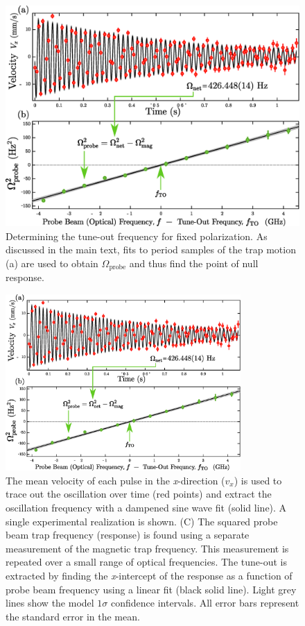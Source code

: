 	\begin{figure}[t]
	\includegraphics[width=\textwidth]{fig/tuneout/freq_measurement}
	\caption{
	Determining the tune-out frequency for fixed polarization. As discussed in the main text, fits to period samples of the trap motion (a) are used to obtain $\Omega_\textrm{probe}$ and thus find the point of null response.
	}
	\label{fig:freq_method} 
	\end{figure}


	\begin{figure}
	\centering
	\includegraphics[width=0.8\textwidth]{fig/tuneout/freq_measurement}
	\caption{
	 The mean velocity of each pulse in the \textit{x}-direction ($v_x$) is used to trace out the oscillation over time (red points) and extract the oscillation frequency with a dampened sine wave fit (solid line). A single experimental realization is shown. (C) The squared probe beam trap frequency (response) is found using a separate measurement of the magnetic trap frequency. This measurement is repeated over a small range of optical frequencies. The tune-out is extracted by finding the \textit{x}-intercept of the response as a function of probe beam frequency using a linear fit (black solid line). Light grey lines show the model \(1\sigma\) confidence intervals. All error bars represent the standard error in the mean.
	}
	\label{fig:exp_schematic} 
	\end{figure}



